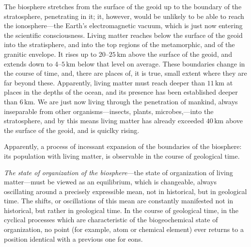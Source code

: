 The biosphere stretches from the surface of the geoid up to the boundary of the
stratosphere, penetrating in it; it, however, would be unlikely to be able to
reach the ionosphere---the Earth's electromagnetic vacuum, which is just now
entering the scientific consciousness.  Living matter reaches below the surface
of the geoid into the stratisphere, and into the top regions of the
metamorphic, and of the granitic envelope.  It rises up to
20--$25\,\mathrm{km}$ above the surface of the geoid, and extends down to
4--$5\,\mathrm{km}$ below that level on average.  These boundaries change in
the course of time, and, there are places of, it is true, small extent where
they are far beyond these.  Apparently, living matter must reach deeper than
$11\,\mathrm{km}$ at places in the depths of the ocean, and its presence has
been established deeper than $6\,\mathrm{km}$.  We are just now living through the penetration of mankind, always
inseparable from other organisms---insects, plants, microbes,---into the
stratosphere, and by this means living matter has already exceeded
$40\,\mathrm{km}$ above the surface of the geoid, and is quiclky rising.

Apparently, a process of incessant expansion of the boundaries of the
biosphere: its population with living matter, is observable in the course of
geological time.


\Section %
\emph{The state of organization of the biosphere}---the state of organization
of living matter---must be viewed as an equilibrium, which is changeable,
always oscillating around a precisely expressible mean, not in historical, but
in geological time.  The shifts, or oscillations of this mean are constantly
manifested not in historical, but rather in geological time.  In the course of
geological time, in the cyclical processes which are characteristic of the
biogeochemical state of organization, no point (for example, atom or chemical
element) ever returns to a position identical with a previous one for eons.

